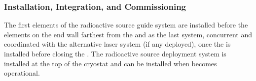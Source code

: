 \begin{comment}
\begin{dunetable}
[Calibration risks3]
{p{0.03\linewidth}p{0.4\linewidth}p{0.05\linewidth}p{0.4\linewidth}}
{tab:fdgen-calib-risks3}
{Possible risk scenarios for the radioactive source system along with mitigation strategies. The level of risk is indicated by letters ``H'', ``M'', and ``L'' corresponding to high, medium and low level risks.}   
No. & Risk  & Risk Level & Mitigation Strategy  \\ \toprowrule

10 & The deployed radioactive source can potentially swing into detector elements if not controlled or if large currents exist in the \dword{lar} & M & Guide-wires mitigate this risk.\\ \colhline

11 & Radioactivity could leak into the detector during a deployment. & L & Rigorous source certification under large pressure and cryogenic temperatures mitigates this risk.\\ \colhline

12 & The source could get stuck or lost in the detector. & L & Fish-line an order of magnitude stronger than needed to hold the weight, round edges of the moderator and a torque limit of the stepper motor will mitigate this risk.\\ \colhline

13 & Oxygen and nitrogen could get into the \dword{lar} in case the purge-box has a small leak. & M & Leak checks before deployments, purge-box in under-pressure inside w/r to the detector, will mitigate this risk.\\ \colhline

14 & Light could couple into the detector. & M &
Light-tight purge-box, internally equipped with an infra-red camera for visual checks will mitigate this risk.\\ \colhline

15 & The source activity can activate the cryostat insulation. & L & Detailed simulations/activation measurements can say what is a tolerable activity and the source activity can be chosen to be below that. \\ \colhline
\end{dunetable}
\end{comment}

\subsubsection{Installation, Integration, and Commissioning}
The first elements of the radioactive source guide system are installed before the  elements on the end wall farthest from the  and as the last system, concurrent and coordinated with the alternative laser system (if any deployed), once the  is installed before closing the . The radioactive source deployment system is installed at the top of the cryostat and can be installed when  becomes operational.

